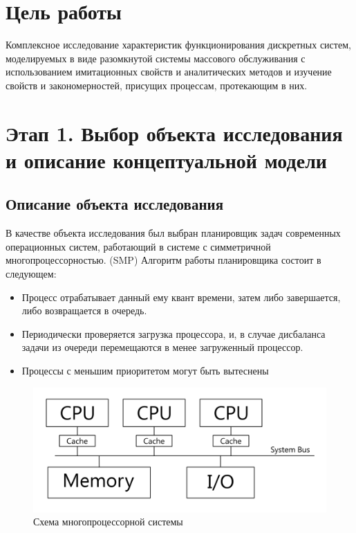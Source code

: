 

\usepackage{graphicx}
\usepackage{adjustbox}
\usepackage{multirow}

\def \labtype {Курсовая}
\def \labsubj {Моделирование}
\def \labauthor {Айтуганов Д. А. \\ Чебыкин И. Б.}
\def \labgroup {P3301}
\def \labinsp {Муравьева-Витковская Л. А.}
\def \labname{Творческая работа: Моделирование многопроцессорного планировщика задач}
\isonefalse
\isnumfalse
\isnametrue


\lstset{
	caption=\lstname,
	basicstyle=\ttfamily\selectfont\scriptsize
}


\tableofcontents
\newpage
\section{Цель работы}
Комплексное исследование характеристик функционирования дискретных систем,
моделируемых в виде разомкнутой системы массового обслуживания с использованием
имитационных свойств и аналитических методов и изучение свойств и
закономерностей, присущих процессам, протекающим в них.
\section{Этап 1. Выбор объекта исследования и описание концептуальной модели}
\subsection{Описание объекта исследования}
В качестве объекта исследования был выбран планировщик задач современных
операционных систем, работающий в системе с симметричной многопроцессорностью.
(SMP)
Алгоритм работы планировщика состоит в следующем:
\begin{itemize}
\item Процесс отрабатывает данный ему квант времени, затем либо завершается,
либо возвращается в очередь.
\item Периодически проверяется загрузка процессора, и, в случае
дисбаланса задачи из очереди перемещаются в менее загруженный процессор.
\item Процессы с меньшим приоритетом могут быть вытеснены
\end{itemize}
\begin{figure}[h]
\centering
\includegraphics[resolution=96]{img/smp.png}
\caption{Схема многопроцессорной системы}
\end{figure}

